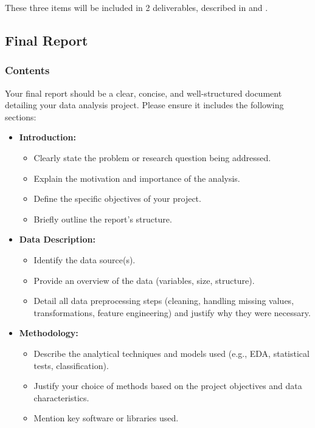 \documentclass[11pt]{exam}
\begin{document}
    These three items will be included in 2 deliverables, described in  and .

    \subsection{Final Report}
    \label{subsec:report}
    \subsubsection{Contents}
    Your final report should be a clear, concise, and well-structured document detailing your data analysis project. Please ensure it includes the following sections:

    \begin{itemize}
        \item \textbf{Introduction:}
        \begin{itemize}
            \item Clearly state the problem or research question being addressed.
            \item Explain the motivation and importance of the analysis.
            \item Define the specific objectives of your project.
            \item Briefly outline the report's structure.
        \end{itemize}

        \item \textbf{Data Description:}
        \begin{itemize}
            \item Identify the data source(s).
            \item Provide an overview of the data (variables, size, structure).
            \item Detail all data preprocessing steps (cleaning, handling missing values, transformations, feature engineering) and justify why they were necessary.
        \end{itemize}

        \item \textbf{Methodology:}
        \begin{itemize}
            \item Describe the analytical techniques and models used (e.g., EDA, statistical tests, classification).
            \item Justify your choice of methods based on the project objectives and data characteristics.
            \item Mention key software or libraries used.
        \end{itemize}


\end{itemize}
\end{document}
